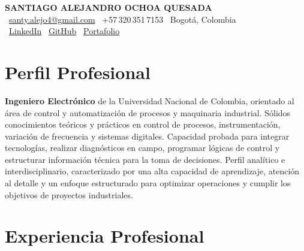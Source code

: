 \documentclass[11pt,a4paper]{article}
\newcommand{\cvsection}[1]{
    \setcounter{cventrycount}{0}
    \section{#1}
}
\newcounter{cventrycount}
\begin{document}
\thispagestyle{empty}
\pagecolor{headerbg}
\color{darktext}

\begin{center}
    {\Huge \bfseries\color{accent} SANTIAGO ALEJANDRO OCHOA QUESADA} \\[8pt]
    {\small\color{darktext}
    \faEnvelope\ \href{mailto:santy.alejo4@gmail.com}{santy.alejo4@gmail.com}
    \quad\textcolor{bulletline}{\textbar}\quad
    \faPhone\ +57\,320\,351\,7153
    \quad\textcolor{bulletline}{\textbar}\quad
    \faMapMarker*\ Bogotá, Colombia \\[5pt]
    \faLinkedin\ \href{https://linkedin.com/in/santiago-alejandro-ochoa-quesada-a07a18288/}{LinkedIn}
    \quad\textcolor{bulletline}{\textbar}\quad
    \faGithub\ \href{https://github.com/Sochoaq}{GitHub}
    \quad\textcolor{bulletline}{\textbar}\quad
    \faGlobe\ \href{https://sochoaq.wixsite.com/website-144}{Portafolio}
    }
\end{center}
\vspace{10pt}

\section{Perfil Profesional}
\textbf{Ingeniero Electrónico} de la Universidad Nacional de Colombia, orientado al área de control y automatización de procesos y maquinaria industrial. Sólidos conocimientos teóricos y prácticos en control de procesos, instrumentación, variación de frecuencia y sistemas digitales. Capacidad probada para integrar tecnologías, realizar diagnósticos en campo, programar lógicas de control y estructurar información técnica para la toma de decisiones. Perfil analítico e interdisciplinario, caracterizado por una alta capacidad de aprendizaje, atención al detalle y un enfoque estructurado para optimizar operaciones y cumplir los objetivos de proyectos industriales.

\cvsection{Experiencia Profesional}
\end{document}
